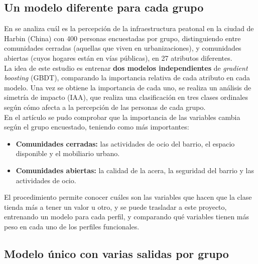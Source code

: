 \subsection{Un modelo diferente para cada grupo}
\label{subsec:perfiles-modelo-por-grupo}



En \textcite{dong2019} se analiza cuál es la percepción de la infraestructura peatonal en la ciudad de Harbin (China) con 400 personas encuestadas por grupo, distinguiendo entre comunidades cerradas (aquellas que viven en urbanizaciones), y comunidades abiertas (cuyos hogares están en vías públicas), en 27 atributos diferentes.
\\

La idea de este estudio es entrenar \textbf{dos modelos independientes} de \textit{gradient boosting} (\gls{GBDT}), comparando la importancia relativa de cada atributo en cada modelo. Una vez se obtiene la importancia de cada uno, se realiza un análisis de simetría de impacto (\gls{IAA}), que realiza una clasificación en tres clases ordinales según cómo afecta a la percepción de las personas de cada grupo.
\\

En el artículo se pudo comprobar que la importancia de las variables cambia según el grupo encuestado, teniendo como más importantes:
\begin{itemize}
  \item \textbf{Comunidades cerradas:} las actividades de ocio del barrio, el espacio disponible y el mobiliario urbano.
  \item \textbf{Comunidades abiertas:} la calidad de la acera, la seguridad del barrio y las actividades de ocio.
\end{itemize}

El procedimiento permite conocer cuáles son las variables que hacen que la clase tienda más a tener un valor u otro, y se puede trasladar a este proyecto, entrenando un modelo para cada perfil, y comparando qué variables tienen más peso en cada uno de los perfiles funcionales.
\\

\subsection{Modelo único con varias salidas por grupo}
\label{subsec:perfiles-multisalida}

